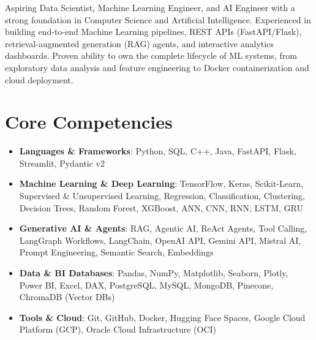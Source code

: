\documentclass[11pt,a4paper,sans]{moderncv}
\begin{document}
\makecvtitle


\vspace{6pt}
\small{Aspiring Data Scientist, Machine Learning Engineer, and AI Engineer with a strong foundation in Computer Science and Artificial Intelligence. Experienced in building end-to-end Machine Learning pipelines, REST APIs (FastAPI/Flask), retrieval-augmented generation (RAG) agents, and interactive analytics dashboards. Proven ability to own the complete lifecycle of ML systems, from exploratory data analysis and feature engineering to Docker containerization and cloud deployment.}


\section{Core Competencies}
\vspace{1pt}
\begin{itemize}

\item \textbf{Languages \& Frameworks}: Python, SQL, C++, Java, FastAPI, Flask, Streamlit, Pydantic v2

\item \textbf{Machine Learning \& Deep Learning}: TensorFlow, Keras, Scikit-Learn, Supervised \& Unsupervised Learning, Regression, Classification, Clustering, Decision Trees, Random Forest, XGBoost, ANN, CNN, RNN, LSTM, GRU

\item \textbf{Generative AI \& Agents}: RAG, Agentic AI, ReAct Agents, Tool Calling, LangGraph Workflows, LangChain, OpenAI API, Gemini API, Mistral AI, Prompt Engineering, Semantic Search, Embeddings

\item \textbf{Data \& BI Databases}: Pandas, NumPy, Matplotlib, Seaborn, Plotly, Power BI, Excel, DAX, PostgreSQL, MySQL, MongoDB, Pinecone, ChromaDB (Vector DBs)

\item \textbf{Tools \& Cloud}: Git, GitHub, Docker, Hugging Face Spaces, Google Cloud Platform (GCP), Oracle Cloud Infrastructure (OCI)

\end{itemize}
\end{document}
